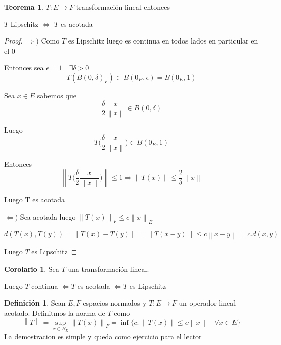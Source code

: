 \documentclass[12pt]{article}
\newcommand{\Ra}{\Rightarrow}
\newcommand{\ra}{\rightarrow}
\newcommand{\norm}[1]{\left\lVert#1\right\rVert}
\theoremstyle{definition}
\newtheorem{definition}{Definición}[section]
\newtheorem{theorem}{Teorema}
\newtheorem{corollary}{Corolario}[theorem]
\begin{document}
      \begin{theorem}
      $T:E \ra F$ transformación lineal entonces
     \begin{center}
       $T$ Lipschitz $\iff$ $T$ es acotada
     \end{center}

      \begin{proof}
	$\Ra)$ Como $T$ es Lipschitz luego es continua en todos lados en particular en el 0

       Entonces sea $\epsilon = 1 \quad \exists \delta > 0$ $$T(B(0,\delta)_{F}) \subset B(0_{E}, \epsilon) = B(0_{E},1)$$
	
       Sea $x \in E$ sabemos que $$\frac{\delta}{2}\frac{x}{\norm{x}} \in B(0,\delta)$$

       Luego $$ T\biggl( \frac{\delta}{2}\frac{x}{\norm{x}} \biggr) \in B(0_{E},1)$$

       Entonces $$ \norm{T\biggl( \frac{\delta}{2}\frac{x}{\norm{x}} \biggr)} \leq 1 \Ra \norm{T(x)} \leq \frac{2}{\delta}\norm{x}$$ 

       Luego T es acotada

     $\Leftarrow)$ Sea acotada luego $\norm {T(x)}_{F} \leq c \norm{x}_{E}$

     $$ d(T(x),T(y)) = \norm {T(x) - T(y)} = \norm{T(x-y)}\leq c\norm{x-y} = c.d(x,y)$$

     Luego $T$ es Lipschitz
      \end{proof}
      \end{theorem}

      \begin{corollary}
	Sea $T$ una transformación lineal. 
	\begin{center}Luego $T$ continua $\iff T$ es acotada $\iff T$ es Lipschitz

	\end{center}
      \end{corollary}

      \begin{definition}
	Sean $E,F$ espacios normados y $T:E \ra F$ un operador lineal acotado. Definitmos la norma de $T$ como
	$$\norm{T} = \sup_{x \in B_{E}} \norm{T(x)}_{F} = \inf{\{c: \norm{T(x)} \leq c\norm{x} \quad \forall x \in E \}}$$
	La demostracion es simple y queda como ejercicio para el lector

      \end{definition}
\end{document}
